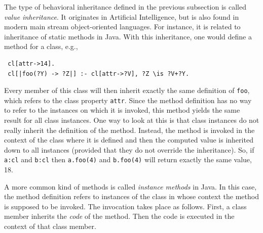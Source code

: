 \documentclass[11pt]{article}
\begin{document}
The type of behavioral inheritance defined in the previous subsection is
called \emph{value inheritance}.  It originates in Artificial Intelligence,
but is also found in modern main stream object-oriented languages.
For instance, it is related to inheritance of static methods in Java.
With this inheritance, one would define a method for a class, e.g., 
\begin{verbatim}
 cl[attr->14].
 cl[|foo(?Y) -> ?Z|] :- cl[attr->?V], ?Z \is ?V+?Y.
\end{verbatim}
Every member of this class will then inherit exactly the same definition of
{\tt foo},
which refers to the class property {\tt attr}. Since the method definition
has no way to refer to the instances on which it is invoked,
this method yields the same result for all class instances.
One way to look at this is
that class instances do not really inherit the definition of the method.
Instead, the method is invoked in the context of the class where it is
defined and then the computed value is inherited down to all instances
(provided that they do not override the inheritance).  So, if {\tt a:cl}
and {\tt b:cl} then {\tt a.foo(4)} and {\tt b.foo(4)} will return exactly
the same value, 18.

A more common kind of methods is called \emph{instance methods} in Java.
In this case, the method definition refers to instances of the class in
whose context the method is supposed to be invoked. The invocation takes
place as follows. First, a class member inherits the \emph{code} of the
method. Then the code is executed in the context of that class member.
\end{document}
